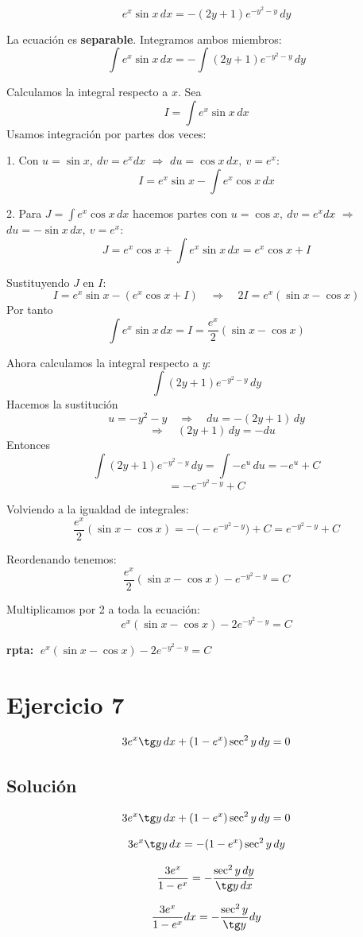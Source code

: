 \documentclass[12pt,a4paper]{article}
\begin{document}
\begin{multicols}{2}
\[
e^{x}\sin x\,dx=-(2y+1)e^{-y^2-y}\,dy
\]

La ecuación es \textbf{separable}. Integramos ambos miembros:
\[
\int e^{x}\sin x\,dx = -\int (2y+1)e^{-y^2-y}\,dy
\]

Calculamos la integral respecto a \(x\). Sea
\[
I=\int e^{x}\sin x\,dx
\]
Usamos integración por partes dos veces:

1. Con \(u=\sin x,\ dv=e^x dx\) \(\Rightarrow\) \(du=\cos x\,dx,\ v=e^x\):
\[
I=e^x\sin x-\int e^x\cos x\,dx
\]

2. Para \(J=\int e^x\cos x\,dx\) hacemos partes con \(u=\cos x,\ dv=e^x dx\) \(\Rightarrow\) \(du=-\sin x\,dx,\ v=e^x\):
\[
J=e^x\cos x+\int e^x\sin x\,dx = e^x\cos x + I
\]

Sustituyendo \(J\) en \(I\):
\[
I = e^x\sin x - (e^x\cos x + I) \quad\Rightarrow\quad 2I = e^x(\sin x-\cos x)
\]
Por tanto
\[
\; \int e^{x}\sin x\,dx = I = \frac{e^x}{2}(\sin x-\cos x)\; 
\]

Ahora calculamos la integral respecto a \(y\):
\[
\int (2y+1)e^{-y^2-y}\,dy
\]
Hacemos la sustitución
\[
u=-y^2-y \quad\Rightarrow\quad du=-(2y+1)\,dy 
\]
\[\quad\Rightarrow\quad (2y+1)\,dy=-du
\]
Entonces
\[
\int (2y+1)e^{-y^2-y}\,dy = \int -e^{u}\,du = -e^{u} + C
\] 
\[
= -e^{-y^2-y}+C
\]

Volviendo a la igualdad de integrales:
\[
\frac{e^x}{2}(\sin x-\cos x) = -\big(-e^{-y^2-y}\big) + C
= e^{-y^2-y} + C
\]

Reordenando tenemos:
\[
\;\frac{e^x}{2}(\sin x-\cos x)-e^{-y^2-y}=C\;
\]

Multiplicamos por 2 a toda la ecuación:
\[
\;{e^x}(\sin x-\cos x)-2e^{-y^2-y}=C\;
\]

\textbf{rpta: } \(\;{e^x}(\sin x-\cos x)-2e^{-y^2-y}=C\)

\columnbreak
\section*{Ejercicio 7} \[3e^x\tg y \, dx+(1-e^x)\sec^2 y \, dy=0\] 
\subsection*{Solución} 
\[3e^x\tg y \, dx+(1-e^x)\sec^2 y \, dy=0\] 

\[3e^x\tg y\,dx=-(1-e^x)\sec^2 y\,dy\] 

\[\frac{3e^x}{1-e^x}=-\frac{\sec^2 y\,dy}{\tg y\,dx}\] 

\[\frac{3e^x}{1-e^x}dx=-\frac{\sec^2 y}{\tg y}dy\] 


\end{multicols}
\end{document}
